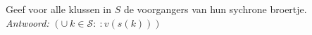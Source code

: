 
\item Geef voor alle klussen in $S$ de voorgangers van hun sychrone broertje. \\


\emph{Antwoord:} $(\cup ~ k \in \mathcal{S} : ~ : v(s(k)) )$ \\

